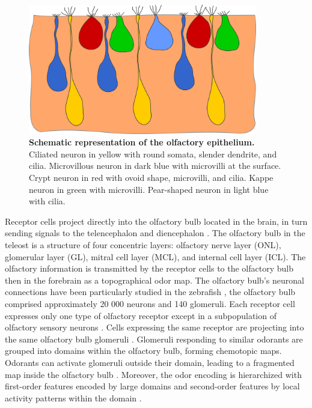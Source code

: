     \begin{figure}[h]
      \centering
      \includegraphics[width=10cm]{part_2/assets/olfactory_schematic_full.png}
      \caption{{\bf Schematic representation of the olfactory epithelium.} Ciliated neuron in yellow with round somata, slender dendrite, and cilia. Microvillous neuron in dark blue with microvilli at the surface. Crypt neuron in red with ovoid shape, microvilli, and cilia. Kappe neuron in green with microvilli. Pear-shaped neuron in light blue with cilia.}
      \label{olfactory_schematic_full}
    \end{figure}

Receptor cells project directly into the olfactory bulb located in the brain, in turn sending signals to the telencephalon and diencephalon \cite{miyasaka2009olfactory}. The olfactory bulb in the teleost is a structure of four concentric layers: olfactory nerve layer (ONL), glomerular layer (GL), mitral cell layer (MCL), and internal cell layer (ICL). The olfactory information is transmitted by the receptor cells to the olfactory bulb \cite{nikonov2001electrophysiological} then in the forebrain \cite{nikonov2005beyond} as a topographical odor map. The olfactory bulb's neuronal connections have been particularly studied in the zebrafish \cite{hansen1998peripheral,kermen2013neural}, the olfactory bulb comprised approximately 20 000 neurons \cite{friedrich2009processing} and 140 glomeruli\cite{braubach2012distribution}. Each receptor cell expresses only one type of olfactory receptor \cite{serizawa2004one,barth1997noncoordinate,weth1996nested,sato2007hierarchical} except in a subpopulation of olfactory sensory neurons \cite{sato2007hierarchical}. Cells expressing the same receptor are projecting into the same olfactory bulb glomeruli \cite{sato2005mutually}. Glomeruli responding to similar odorants are grouped into domains within the olfactory bulb, forming chemotopic maps. Odorants can activate glomeruli outside their domain, leading to a fragmented map inside the olfactory bulb \cite{friedrich1998chemotopic}. Moreover, the odor encoding is hierarchized with first-order features encoded by large domains and second-order features by local activity patterns within the domain \cite{fuss2001odorant,korsching2001odor}.

